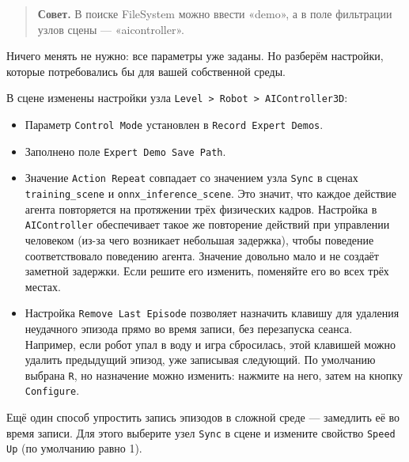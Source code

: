 \documentclass[11pt,a4paper]{article}
\begin{document}
\begin{quote}
\textbf{Совет.} В поиске FileSystem можно ввести «demo», а в поле фильтрации узлов сцены --- «aicontroller».
\end{quote}


Ничего менять не нужно: все параметры уже заданы. Но разберём настройки, которые потребовались бы для вашей собственной среды.

В сцене изменены настройки узла \passthrough{\lstinline!Level > Robot > AIController3D!}:

\begin{itemize}
\tightlist
\item
  Параметр \passthrough{\lstinline!Control Mode!} установлен в \passthrough{\lstinline!Record Expert Demos!}.
\item
  Заполнено поле \passthrough{\lstinline!Expert Demo Save Path!}.
\item
  Значение \passthrough{\lstinline!Action Repeat!} совпадает со значением узла \passthrough{\lstinline!Sync!} в сценах \passthrough{\lstinline!training_scene!} и \passthrough{\lstinline!onnx_inference_scene!}. Это значит, что каждое действие агента повторяется на протяжении трёх физических кадров. Настройка в \passthrough{\lstinline!AIController!} обеспечивает такое же повторение действий при управлении человеком (из-за чего возникает небольшая задержка), чтобы поведение соответствовало поведению агента. Значение довольно мало и не создаёт заметной задержки. Если решите его изменить, поменяйте его во всех трёх местах.
\item
  Настройка \passthrough{\lstinline!Remove Last Episode!} позволяет назначить клавишу для удаления неудачного эпизода прямо во время записи, без перезапуска сеанса. Например, если робот упал в воду и игра сбросилась, этой клавишей можно удалить предыдущий эпизод, уже записывая следующий. По умолчанию выбрана \passthrough{\lstinline!R!}, но назначение можно изменить: нажмите на него, затем на кнопку \passthrough{\lstinline!Configure!}.
\end{itemize}

Ещё один способ упростить запись эпизодов в сложной среде --- замедлить её во время записи. Для этого выберите узел \passthrough{\lstinline!Sync!} в сцене и измените свойство \passthrough{\lstinline!Speed Up!} (по умолчанию равно 1).
\end{document}
